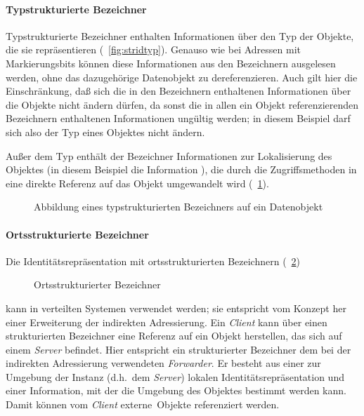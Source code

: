 \paragraph{Typstrukturierte Bezeichner}%
\label{enu:stridtyp}%
%
Typstrukturierte Bezeichner enthalten Informationen \"{u}ber den Typ der
Objekte, die sie repr\"{a}sentieren (\figurename~\ref{fig:stridtyp}).
Genauso wie bei Adressen mit Markierungsbits k\"{o}nnen diese
Informationen aus den Bezeichnern ausgelesen werden, ohne das
dazugeh\"{o}rige Datenobjekt zu dereferenzieren. Auch gilt hier die
Einschr\"{a}nkung, da\ss{} sich die in den Bezeichnern enthaltenen
Informationen \"{u}ber die Objekte nicht \"{a}ndern d\"{u}rfen, da sonst die in
allen ein Objekt referenzierenden Bezeichnern enthaltenen
Informationen ung\"{u}ltig werden; in diesem Beispiel darf sich also der
Typ eines Objektes nicht \"{a}ndern.
%
\par{}Au\ss{}er dem Typ enth\"{a}lt der Bezeichner Informationen
zur Lokalisierung des Objektes (in diesem Beispiel die Information
), die durch die Zugriffsmethoden in eine direkte
Referenz auf das Objekt umgewandelt wird
(\figurename~\ref{fig:exidrepr}).
%
\begin{figure}[hbtp]%
\ifbuch%
\centerline{}%
\else%
\centerline{}%
\fi%
\caption{Abbildung eines typstrukturierten Bezeichners auf ein
Datenobjekt}%
\label{fig:exidrepr}%
\end{figure}%
%
\paragraph{Ortsstrukturierte Bezeichner}
%
Die Identit\"{a}tsrepr\"{a}sentation mit ortsstrukturierten Bezeichnern
(\figurename~\ref{fig:stridcs}) %
%
\begin{figure}[htbp]%
\ifbuch%
\centerline{}%
\else%
\centerline{}%
\fi%
\caption{Ortsstrukturierter Bezeichner}\label{fig:stridcs}%
\end{figure}%
%
kann in verteilten Systemen verwendet werden; sie entspricht vom
Konzept her einer Erweiterung der indirekten Adressierung.  Ein {\em
Client\/} kann \"{u}ber einen strukturierten Bezeichner eine Referenz auf
ein Objekt herstellen, das sich auf einem {\em Server\/}
befindet. Hier entspricht ein strukturierter Bezeichner dem bei der
indirekten Adressierung verwendeten {\em Forwarder}. Er besteht aus
einer zur Umgebung der Instanz (d.h.\ dem {\em Server\/}) lokalen
Iden\-ti\-t\"{a}ts\-re\-pr\"{a}\-sen\-ta\-tion und einer Information, mit
der die Umgebung des Objektes bestimmt werden kann. Damit k\"{o}n\-nen
vom {\em Client\/} \rglq{}externe\rgrq\ Objekte referenziert werden.
%
